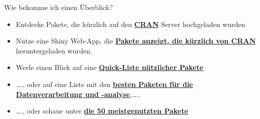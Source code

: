 \documentclass[ignorenonframetext,]{beamer}
\begin{document}
\begin{frame}{Wie bekomme ich einen Überblick?}
\protect\hypertarget{wie-bekomme-ich-einen-uberblick}{}

\begin{itemize}
\item
  Entdecke Pakete, die kürzlich auf den
  \href{https://mran.microsoft.com/packages/}{\textbf{CRAN}} Server
  hochgeladen wurden
\item
  Nutze eine Shiny Web-App, die
  \href{https://gallery.shinyapps.io/cran-gauge/}{\textbf{Pakete
  anzeigt, die kürzlich von CRAN}} heruntergeladen wurden.
\item
  Werfe einen Blick auf eine
  \href{https://support.rstudio.com/hc/en-us/articles/201057987-Quick-list-of-useful-R-packages}{\textbf{Quick-Liste
  nützlicher Pakete}}
\item
  \ldots{}., oder auf eine Liste mit den
  \href{http://www.computerworld.com/article/2921176/business-intelligence/great-r-packages-for-data-import-wrangling-visualization.html}{\textbf{besten
  Paketen für die Datenverarbeitung und -analyse}},\ldots{}..
\item
  \ldots{}., oder schaue unter
  \href{https://www.r-bloggers.com/the-50-most-used-r-packages/}{\textbf{die
  50 meistgenutzten Pakete}}
\end{itemize}

\end{frame}
\end{document}
